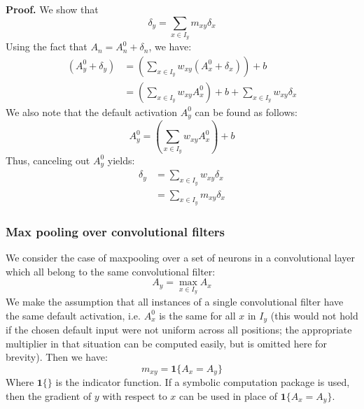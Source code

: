 \documentclass{article}
\begin{document}
{\bf Proof.} We show that
\begin{equation}
\delta_y = \sum_{x \in I_y} m_{xy} \delta_x 
\end{equation}
Using the fact that $A_n = A_n^0 + \delta_n$, we have:
\begin{equation}
\begin{aligned}
(A_y^0 + \delta_y) &= \left(\sum_{x \in I_y} w_{xy} (A_x^0 + \delta_x) \right) + b \\
                              &= \left(\sum_{x \in I_y} w_{xy} A_x^0 \right) + b + \sum_{x \in I_y} w_{xy} \delta_x
\end{aligned}
\end{equation} 
We also note that the default activation $A_y^0$ can be found as follows:
\begin{equation}
A_y^0 = \left(\sum_{x \in I_y} w_{xy} A_x^0 \right) + b
\end{equation}
Thus, canceling out $A_y^0$ yields:
\begin{equation}
\begin{aligned}
\delta_y &= \sum_{x \in I_y} w_{xy} \delta_x\\
             &= \sum_{x \in I_y} m_{xy} \delta_x
\end{aligned}
\end{equation} 

\subsubsection{Max pooling over convolutional filters}

We consider the case of maxpooling over a set of neurons in a convolutional layer which all belong to the same convolutional filter:
\begin{equation}
A_y = \max_{x \in I_y} A_x
\end{equation}
We make the assumption that all instances of a single convolutional filter have the same default activation, i.e. $A_x^0$ is the same for all $x$ in $I_y$ (this would not hold if the chosen default input were not uniform across all positions; the appropriate multiplier in that situation can be computed easily, but is omitted here for brevity). Then we have:
\begin{equation}
m_{xy} = \bm{1}\{A_x = A_y\}
\end{equation}
Where $\bm{1}\{\}$ is the indicator function. If a symbolic computation package is used, then the gradient of $y$ with respect to $x$ can be used in place of $\bm{1}\{A_x = A_y\}$.
\end{document}
